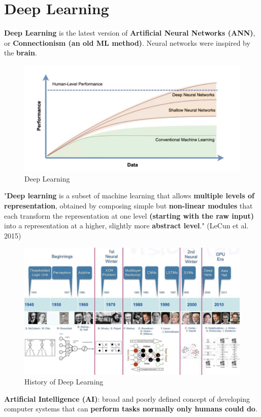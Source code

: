 \section{Deep Learning}
\textbf{Deep Learning} is the latest version of \textbf{Artificial Neural Networks (ANN)}, or \textbf{Connectionism (an old ML method)}. Neural networks were inspired by the \textbf{brain}.
\begin{figure}[h!t]
    \centering
    \includegraphics[width=0.75\linewidth]{deeplearning.png}
    \caption{Deep Learning}
    
    \label{fig:enter-label}
\end{figure}
\begin{definition}
"\textbf{Deep learning} is a subset of machine learning that allows \textbf{multiple levels of
representation}, obtained by composing simple but \textbf{non-linear modules} that
each transform the representation at one level \textbf{(starting with the raw input)}
into a representation at a higher, slightly more \textbf{abstract level}." (LeCun et al. 2015)
\end{definition}
\begin{figure}[h!t]
    \centering
    \includegraphics[width=0.75\linewidth]{historydeeplearning.png}
    \caption{History of Deep Learning}
    \label{fig:enter-label}
\end{figure}
\begin{definition}
    \textbf{Artificial Intelligence (AI)}: broad and poorly defined concept of developing computer systems that can \textbf{perform tasks normally only humans could do}. 
\end{definition}
